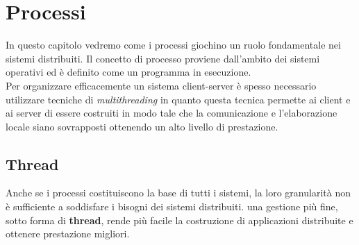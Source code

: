 \section{Processi}\label{capitolo4}
In questo capitolo vedremo come i processi giochino un ruolo fondamentale nei sistemi distribuiti. Il concetto di processo proviene dall'ambito dei sistemi operativi ed è definito come un programma in esecuzione.\\
Per organizzare efficacemente un sistema client-server è spesso necessario utilizzare tecniche di \emph{multithreading} in quanto questa tecnica permette ai client e ai server di essere costruiti in modo tale che la comunicazione e l'elaborazione locale siano sovrapposti ottenendo un alto livello di prestazione.
\subsection{Thread}
Anche se i processi costituiscono la base di tutti i sistemi, la loro granularità non è sufficiente a soddisfare i bisogni dei sistemi distribuiti. una gestione più fine, sotto forma di \textbf{thread}, rende più facile la costruzione di applicazioni distribuite e ottenere prestazione migliori.
